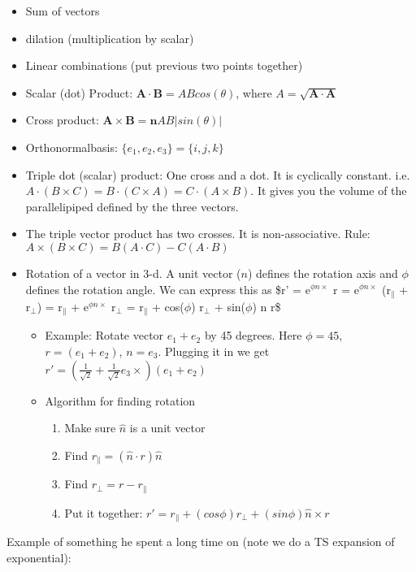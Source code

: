 \documentclass[11pt]{article}
\begin{document}
\begin{itemize}
\item Sum of vectors
\item dilation (multiplication by scalar)
\item Linear combinations (put previous two points together)
\item Scalar (dot) Product: $\bm{A} \cdot \bm{B} = A B
  cos(\theta)$, where $A = \sqrt{\bm{A} \cdot \bm{A}}$
\item Cross product: $\bm{A} \times \bm{B} = \bm{n} A
  B |sin(\theta)|$
\item Orthonormalbasis: $\{e_1, e_2, e_3\} = \{i, j, k\}$
\item Triple dot (scalar) product: One cross and a dot. It is cyclically
  constant. i.e. $A \cdot (B \times C) = B \cdot (C \times A) =C \cdot (A
  \times B)$. It gives you the volume of the parallelipiped defined by the
  three vectors.
\item The triple vector product has two crosses. It is non-associative. Rule: $A
  \times (B \times C) = B(A \cdot C) - C(A \cdot B)$
\item Rotation of a vector in 3-d. A unit vector ($n$) defines the rotation axis
  and $\phi$ defines the rotation angle. We can express this as \$r' = e$^{\phi n
  \times}$ r = e$^{\phi n \times}$ (r$_{\parallel}$ + r$_{\perp}$) = r$_{\parallel}$ +
  e$^{\phi n \times}$ r$_{\perp}$ = r$_{\parallel}$ + cos($\phi$) r$_{\perp}$ + sin($\phi$)
  n \texttimes{} r\$
\begin{itemize}
\item Example: Rotate vector $e_1 + e_2$ by 45 degrees. Here $\phi = 45$, $r =
    (e_1 + e_2)$, $n = e_3$. Plugging it in we get $r' = (\frac{1}{\sqrt{2}} +
    \frac{1}{\sqrt{2}} e_3 \times) (e_1 + e_2)$
\item Algorithm for finding rotation
\begin{enumerate}
\item Make sure $\hat{n}$ is a unit vector
\item Find $r_{\parallel} = (\hat{n} \cdot r) \hat{n}$
\item Find $r_{\perp} = r - r_{\parallel}$
\item Put it together: $r' = r_{\parallel} + (cos \phi) r_{\perp} + (sin \phi)
       \hat{n} \times r$
\end{enumerate}
\end{itemize}
\end{itemize}

Example of something he spent a long time on (note we do a TS expansion of
exponential):
\end{document}
